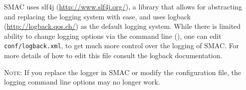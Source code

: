 	SMAC uses slf4j (\url{http://www.slf4j.org/}), a library that allows for abstracting and replacing the logging system with ease, and uses logback (\url{http://logback.qos.ch/}) as the default logging system. While there is limited ability to change logging options via the command line (), one can edit \texttt{conf/logback.xml}, to get much more control over the logging of SMAC. For more details of how to edit this file consult the logback documentation. 
	
	\textsc{Note:} If you replace the logger in SMAC or modify the configuration file, the logging command line options may no longer work.